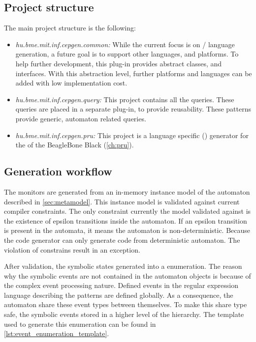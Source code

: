 \subsection{Project structure}

The main project structure is the following:
\begin{itemize}
	\item \emph{hu.bme.mit.inf.cepgen.common:} While the current focus is on \cpl/\cpp{} language generation, a future goal is to support other languages, and platforms. To help further development, this plug-in provides abstract classes, and interfaces. With this abstraction level, further platforms and languages can be added with low implementation cost.
	\item \emph{hu.bme.mit.inf.cepgen.query:} This project contains all the \viatraq{} queries. These queries are placed in a separate plug-in, to provide reusability. These patterns provide generic, automaton related queries.
	\item \emph{hu.bme.mit.inf.cepgen.pru:} This project is a language specific (\cpl{}) generator for the \pru{} of the BeagleBone Black (\cref{ch:pru}).
\end{itemize}

\subsection{Generation workflow}

The monitors are generated from an in-memory instance model of the automaton described in \cref{sec:metamodel}. This instance model is validated against current compiler constraints. The only constraint currently the model validated against is the existence of epsilon transitions inside the automaton. If an epsilon transition is present in the automata, it means the automaton is non-deterministic. Because the code generator can only generate code from deterministic automaton. The violation of constrains result in an exception.

After validation, the symbolic states generated into a \cpp{} enumeration. The reason why the symbolic events are not contained in the automaton objects is because of the complex event processing nature. Defined events in the regular expression language describing the patterns are defined globally. As a consequence, the automaton share these event types between themselves. To make this share type safe, the symbolic events stored in a higher level of the hierarchy. The template used to generate this enumeration can be found in \cref{lst:event_enumeration_template}.


